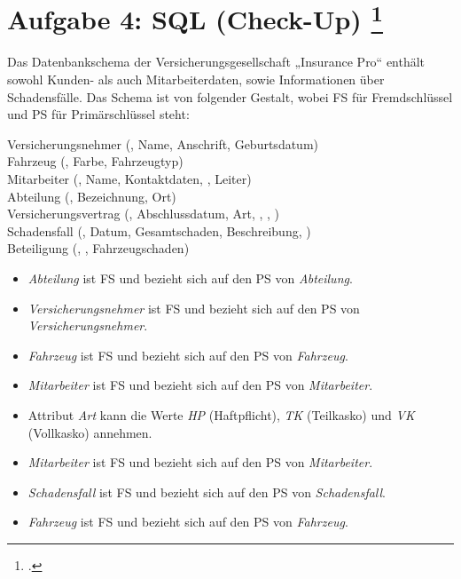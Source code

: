\documentclass{bschlangaul-aufgabe}
\begin{document}
\section{Aufgabe 4: SQL (Check-Up)
\footcite[Thema 1 Teilaufgabe 2 Aufgabe 4]{examen:46116:2015:09}}

Das Datenbankschema der Versicherungsgesellschaft „Insurance Pro“
enthält sowohl Kunden- als auch Mitarbeiterdaten, sowie Informationen
über Schadensfälle. Das Schema ist von folgender Gestalt, wobei FS für
Fremdschlüssel und PS für Primärschlüssel steht:

\bigskip

{
\ttfamily
\noindent
Versicherungsnehmer (, Name, Anschrift, Geburtsdatum)\\

\noindent
Fahrzeug (, Farbe, Fahrzeugtyp)\\

\noindent
Mitarbeiter (, Name, Kontaktdaten, ,
Leiter)\\

\noindent
Abteilung (, Bezeichnung, Ort)\\

\noindent
Versicherungsvertrag (, Abschlussdatum, Art,
, ,
)\\

\noindent
Schadensfall (, Datum, Gesamtschaden, Beschreibung,
)\\

\noindent
Beteiligung (, ,
Fahrzeugschaden)}

\bigskip

\begin{itemize}
\item \emph{Abteilung} ist FS und bezieht sich auf den PS von
\emph{Abteilung}.

\item \emph{Versicherungsnehmer} ist FS und bezieht sich auf den PS von
\emph{Versicherungsnehmer}.

\item \emph{Fahrzeug} ist FS und bezieht sich auf den PS von
\emph{Fahrzeug}.

\item \emph{Mitarbeiter} ist FS und bezieht sich auf den PS von
\emph{Mitarbeiter}.

\item Attribut \emph{Art} kann die Werte \emph{HP} (Haftpflicht),
\emph{TK} (Teilkasko) und \emph{VK} (Vollkasko) annehmen.

\item \emph{Mitarbeiter} ist FS und bezieht sich auf den PS von
\emph{Mitarbeiter}.

\item \emph{Schadensfall} ist FS und bezieht sich auf den PS von
\emph{Schadensfall}.

\item \emph{Fahrzeug} ist FS und bezieht sich auf den PS von
\emph{Fahrzeug}.
\end{itemize}
\end{document}
